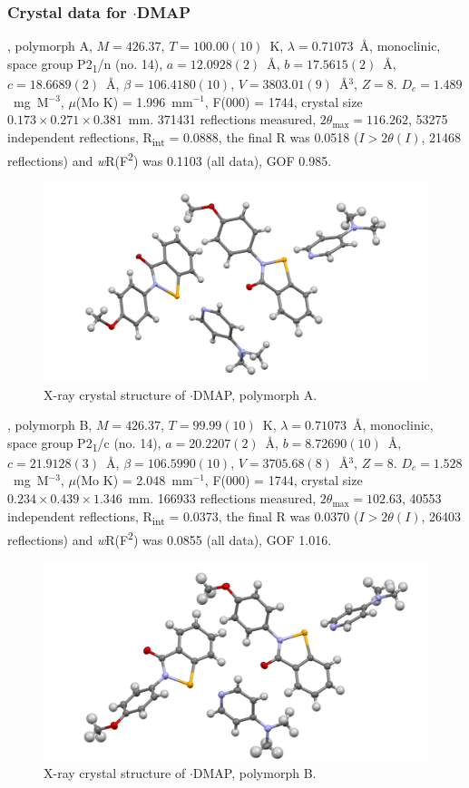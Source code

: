 \begin{refsection}
\subsubsection{Crystal data for \texorpdfstring{$ \cdot $DMAP}{C21 H21 N3 O2 Se}}
, polymorph A, $M=426.37$, $T=100.00(10)$~K, $ \lambda=0.71073 $~\AA, monoclinic, space group P2\textsubscript{1}/n (no. 14), $a = 12.0928(2)$~\AA, $b = 17.5615(2)$~\AA, $c = 18.6689(2)$~\AA, $\beta = 106.4180(10)$\degree, $V = 3803.01(9)$~\AA$^{3}$, $Z = 8$. $D_{c}= 1.489$~mg~M$^{-3}$, $\mu$(Mo K\a) = 1.996~mm$^{-1}$, F(000) = 1744, crystal size $0.173 \times 0.271 \times 0.381$~mm. 371431 reflections measured, $2\theta_{\max}=116.262$\degree, 53275 independent reflections, R\textsubscript{int} = 0.0888, the final R was 0.0518 ($I > 2\theta(I)$, 21468 reflections) and \textit{w}R(F\textsuperscript{2}) was 0.1103 (all data), GOF 0.985.

\begin{figure}
  \includegraphics[width=0.6\linewidth]{Figures/ebs-4ome-dmap-a-xtal.pdf}
  \caption{X-ray crystal structure of \texorpdfstring{$ \cdot $DMAP}{C21 H21 N3 O2 Se}, polymorph A.}
\end{figure}

, polymorph B, $M=426.37$, $T=99.99(10)$~K, $ \lambda=0.71073 $~\AA, monoclinic, space group P2\textsubscript{1}/c (no. 14), $a = 20.2207(2)$~\AA, $b = 8.72690(10)$~\AA, $c = 21.9128(3)$~\AA, $\beta = 106.5990(10)$\degree, $V = 3705.68(8)$~\AA$^{3}$, $Z = 8$. $D_{c}= 1.528$~mg~M$^{-3}$, $\mu$(Mo K\a) = 2.048~mm$^{-1}$, F(000) = 1744, crystal size $0.234 \times 0.439 \times 1.346$~mm. 166933 reflections measured, $2\theta_{\max}=102.63$\degree, 40553 independent reflections, R\textsubscript{int} = 0.0373, the final R was 0.0370 ($I > 2\theta(I)$, 26403 reflections) and \textit{w}R(F\textsuperscript{2}) was 0.0855 (all data), GOF 1.016.

\begin{figure}
  \includegraphics[width=0.6\linewidth]{Figures/ebs-4ome-dmap-b-xtal.pdf}
  \caption{X-ray crystal structure of \texorpdfstring{$ \cdot $DMAP}{C21 H21 N3 O2 Se}, polymorph B.}
\end{figure}


\end{refsection}
